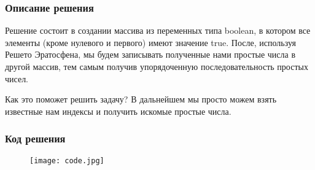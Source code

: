 \documentclass[10pt,pdf,hyperref={unicode}]{beamer}
\begin{document}
\begin{frame}
\frametitle{Описание решения}
Решение состоит в создании массива из переменных типа boolean, в котором все элементы (кроме нулевого и первого) имеют значение true. После, используя Решето Эратосфена, мы будем записывать полученные нами простые числа в другой массив, тем самым получив упорядоченную последовательность простых чисел.
\begin{block}{Как это поможет решить задачу?}
В дальнейшем мы просто можем взять известные нам индексы и получить искомые простые числа.
\end{block}
\end{frame}

\begin{frame}
\frametitle{Код решения}
\begin{figure}
\texttt{[image: code.jpg]}
\end{figure}
\end{frame}
\end{document}
